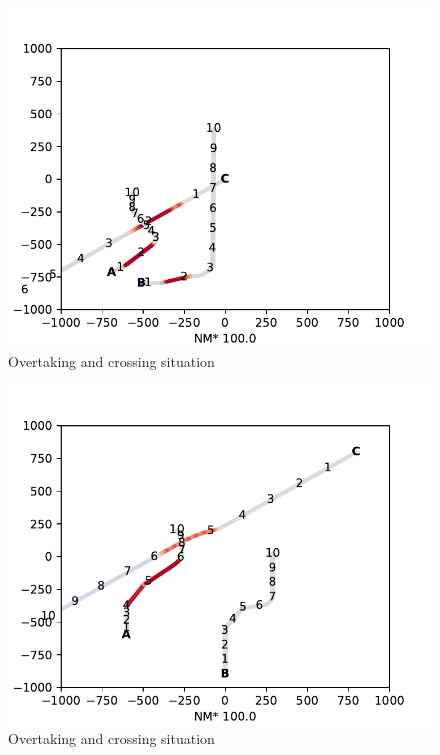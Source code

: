 \begin{figure}[H]
    \centering
    \includegraphics[width=\textwidth,height=0.75\textheight,keepaspectratio]{Figures/Scenario/overtaking-and-crossing-res.pdf}
    \caption{Overtaking and crossing situation}
    \label{fig:overtaking-and-crossing-res}
\end{figure}
\begin{figure}[H]
    \centering
    \includegraphics[width=\textwidth,height=0.75\textheight,keepaspectratio]{Figures/Scenario/overtaking-and-crossing-3-res.pdf}
    \caption{Overtaking and crossing situation }
    \label{fig:overtaking-and-crossing-3-res}
\end{figure}
